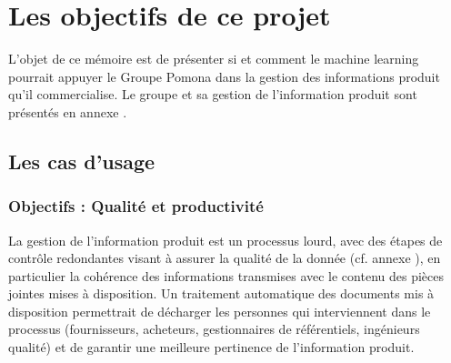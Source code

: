 \part{Les objectifs de ce projet}
    
    {\large
    L'objet de ce mémoire est de présenter si et comment le machine learning pourrait appuyer le Groupe Pomona dans la gestion des informations produit qu'il commercialise.
    Le groupe et sa gestion de l'information produit sont présentés en annexe .
    }

    \chapter{Les cas d'usage}
    \label{use_cases}

        \section{Objectifs : Qualité et productivité}

        La gestion de l'information produit est un processus lourd, avec des étapes de contrôle redondantes visant à assurer la qualité de la donnée (cf. annexe ), en particulier la cohérence des informations transmises avec le contenu des pièces jointes mises à disposition.
        Un traitement automatique des documents mis à disposition permettrait de décharger les personnes qui interviennent dans le processus (fournisseurs, acheteurs, gestionnaires de référentiels, ingénieurs qualité) et de garantir une meilleure pertinence de l'information produit.

